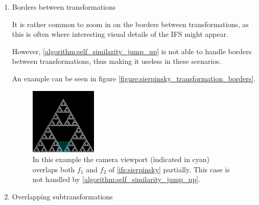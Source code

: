 \documentclass[11pt]{article}
\begin{document}
\begin{enumerate}
\item Borders between transformations
\label{sec:org1d7e9e6}

It is rather common to zoom in on the borders between transformations, as this is often
where interesting visual details of the IFS might appear.

However, \autoref{algorithm:self_similarity_jump_up} is not able to handle borders between transformations,
thus making it useless in these scenarios.

An example can be seen in figure \autoref{figure:sierpinsky_transformation_borders}.

\begin{figure}
\centering
\includegraphics[width=0.3\textwidth]{figures/sierpinsky_transformation_borders}
\caption{In this example the camera viewport (indicated in cyan) overlaps both $f_1$ and $f_2$ of \autoref{ifs:sierpinsky} partially. This case is not handled by \autoref{algorithm:self_similarity_jump_up}. }
\label{figure:sierpinsky_transformation_borders}
\end{figure}

\item Overlapping subtransformations
\label{sec:org72e722e}


\end{enumerate}
\end{document}
